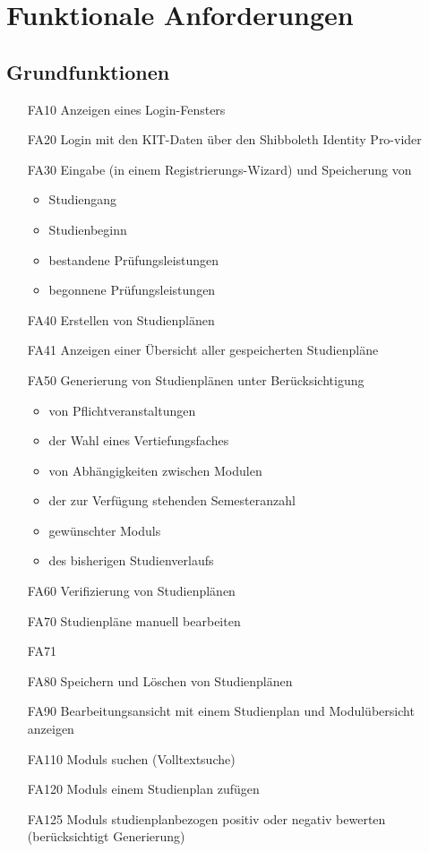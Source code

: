\section{Funktionale Anforderungen}

	\subsection{Grundfunktionen}
	\begin{itemize}[nosep]	
		\item [FA10] Anzeigen eines Login-Fensters
		\item[FA20] Login mit den KIT-Daten über den Shibboleth Identity Pro-vider
		\item [FA30]Eingabe (in einem Registrierungs-\gls{Wizard}) und Speicherung von
		\begin{itemize}[nosep]
			\item Studiengang
			\item Studienbeginn
			\item bestandene Prüfungsleistungen
			\item begonnene Prüfungsleistungen
		\end{itemize}
		\item [FA40] Erstellen von Studienplänen
		\item [FA41]Anzeigen einer Übersicht aller gespeicherten Studienpläne
		\item [FA50] Generierung von Studienplänen unter Berücksichtigung
			\begin{itemize}[nosep]
			\item von Pflichtveranstaltungen
			\item der Wahl eines Vertiefungsfaches
			\item von Abhängigkeiten zwischen Modulen
			\item der zur Verfügung stehenden Semesteranzahl
			\item gewünschter \glspl{Modul}
			\item des bisherigen Studienverlaufs
			\end{itemize}
		\item [FA60] Verifizierung von Studienplänen
		\item [FA70] Studienpläne manuell bearbeiten
		\item [FA71] 
		\item [FA80]Speichern und Löschen von Studienplänen
		\item[FA90] Bearbeitungsansicht mit einem Studienplan und Modulübersicht anzeigen 
		\item[FA110] \glspl{Modul} suchen (Volltextsuche)
		\item[FA120] \glspl{Modul} einem Studienplan zufügen
		\item[FA125] \glspl{Modul} studienplanbezogen positiv oder negativ bewerten (berücksichtigt Generierung)
		\end{itemize}
